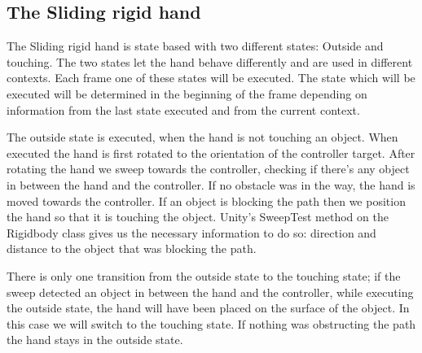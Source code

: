 
\subsection{The Sliding rigid hand}
\label{subsec:slidingRigidHand}
The Sliding rigid hand is state based with two different states: Outside and touching. The two states let the hand behave differently and are used in different contexts. Each frame one of these states will be executed. The state which will be executed will be determined in the beginning of the frame depending on information from the last state executed and from the current context.

The outside state is executed, when the hand is not touching an object. When executed the hand is first rotated to the orientation of the controller target. After rotating the hand we sweep towards the controller, checking if there's any object in between the hand and the controller. If no obstacle was in the way, the hand is moved towards the controller. If an object is blocking the path then we position the hand so that it is touching the object. Unity's SweepTest method on the Rigidbody class gives us the necessary information to do so: direction and distance to the object that was blocking the path.

There is only one transition from the outside state to the touching state; if the sweep detected an object in between the hand and the controller, while executing the outside state, the hand will have been placed on the surface of the object. In this case we will switch to the touching state. If nothing was obstructing the path the hand stays in the outside state.


